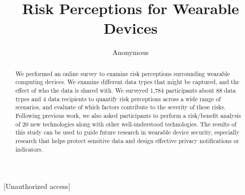 \documentclass{acm_proc_article-sp}
\begin{document}
\title{Risk Perceptions for Wearable Devices}






\author{
 \alignauthor Anonymous\\
   \vspace{0.5em}
}

\maketitle
\begin{abstract}
We performed an online survey to examine risk perceptions surrounding wearable computing devices. We examine different data types that might be captured,  and the effect of who the data is shared with. We surveyed 1,784 participants about 88 data types and 4 data recipients to quantify risk perceptions across a wide range of scenarios, and evaluate of which factors contribute to the severity of these risks. Following previous work, we also asked participants to perform a risk/benefit analysis of 20 new technologies along with other well-understood technologies. The results of this study can be used to guide future research in wearable device security, especially research that helps protect sensitive data and design effective privacy notifications or indicators.
\end{abstract}

[Unauthorized access]
\end{document}
